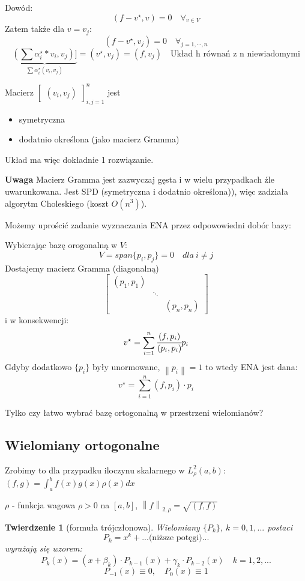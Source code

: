 \documentclass[hidelinks,a4paper,fleqn,oneside]{book}
\newcommand{\norm}[1]{\left\lVert#1\right\rVert}
\newtheorem{twierdz}{Twierdzenie}
\begin{document}
Dowód:
\[
	(f- v^\star, v) = 0 \quad \forall_{v \in V}
\]
Zatem także dla $v = v_j$:
\[
	(f-v^\star, v_j) = 0 \quad \forall_{j = 1, \cdots, n}
\]
\[
	\underbrace{(\sum \alpha_i^\star *v_i, v_j)]}_{\sum \alpha_i^\star(v_i, v_j)} = (v^\star, v_j) = (f, v_j) \quad \textrm{Układ h równań z n niewiadomymi}
\]

Macierz $\left[ \begin{array}{c} (v_i, v_j) \end{array} \right]_{i, j=1}^n$ jest
\begin{itemize}
	\item symetryczna
	\item dodatnio określona (jako macierz Gramma)
\end{itemize}

Układ ma więc dokładnie 1 rozwiązanie.

\textbf{Uwaga} Macierz Gramma jest zazwyczaj gęsta i w wielu przypadkach źle uwarunkowana. Jest SPD (symetryczna i dodatnio określona)), więc zadziała algorytm Choleskiego (koszt $O(n^3)$).

Możemy uprościć zadanie wyznaczania ENA przez odpowowiedni dobór bazy:

Wybierając bazę orogonalną w $V$:
\[
	V = span\{p_i, p_j\} = 0 \quad dla\ i \neq j
\]
Dostajemy macierz Gramma (diagonalną)
\[
	\left[
		\begin{array}{ccc}
		(p_1,p_1) &  &  \\
		 & \ddots & \\
		 &  & (p_n, p_n)
		\end{array}
	\right]
\]
i w konsekwencji:
\[
	v^\star = \sum_{i=1}^n \cfrac{(f, p_i)}{(p_i, p_i)}p_i
\]
Gdyby dodatkowo $\{p_i\}$ były unormowane, $\norm{p_i} = 1$ to wtedy ENA jest dana:
\[
	v^\star = \sum_{i=1}^{n}(f, p_i) \cdot p_i
\]

Tylko czy łatwo wybrać bazę ortogonalną w przestrzeni wielomianów?

\subsection{Wielomiany ortogonalne}

Zrobimy to dla przypadku iloczynu skalarnego w $L^2_\rho(a, b)$: $(f, g) = \int_a^b f(x)g(x)\rho(x)dx$

$\rho$ - funkcja wagowa $\rho > 0$ na $[a, b]$, $\norm{f}_{2, \rho} = \sqrt{(f, f)}$

\begin{twierdz}[formuła trójczłonowa]
	Wielomiany $\{P_k\}$, $k = 0, 1, ...$ postaci
	\[
		P_k = x^k + ...\textrm{(niższe potęgi)}...
	\]
	wyrażają się wzorem:
	\[
		P_k(x) = (x + \beta_k) \cdot P_{k-1}(x) + \gamma_k \cdot P_{k-2}(x) \quad k=1, 2, ...
	\]
	\[
		P_{-1}(x) \equiv 0, \quad P_0(x) \equiv 1
	\]
\end{twierdz}
\end{document}
